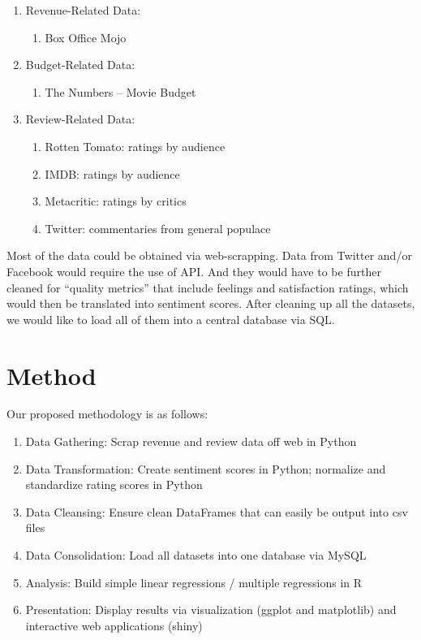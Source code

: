 \documentclass{article}
\begin{document}
\begin{enumerate}
	\item	Revenue-Related Data:
	\begin{enumerate}
 		\item	Box Office Mojo
 	\end{enumerate}
	\item	Budget-Related Data:
 	\begin{enumerate}
 		\item	The Numbers – Movie Budget
 	\end{enumerate}
	\item	Review-Related Data:
 	\begin{enumerate}
 		\item	Rotten Tomato: ratings by audience
 		\item	IMDB:  ratings by audience
 		\item	Metacritic:  ratings by critics
 		\item	Twitter:  commentaries from general populace
 	\end{enumerate}
\end{enumerate}

Most of the data could be obtained via web-scrapping.  Data from Twitter and/or Facebook would require the use of API.  And they would have to be further cleaned for “quality metrics” that include feelings and satisfaction ratings, which would then be translated into sentiment scores.  After cleaning up all the datasets, we would like to load all of them into a central database via SQL.

\section{Method}
Our proposed methodology is as follows:

\begin{enumerate}
	\item Data Gathering:  Scrap revenue and review data off web in Python
	\item Data Transformation:  Create sentiment scores in Python; normalize and standardize rating scores in Python
	\item Data Cleansing:  Ensure clean DataFrames that can easily be output into csv files
	\item Data Consolidation:  Load all datasets into one database via MySQL
	\item Analysis:  Build simple linear regressions / multiple regressions in R
	\item Presentation:  Display results via visualization (ggplot and matplotlib) and interactive web applications (shiny)
\end{enumerate}
\end{document}
